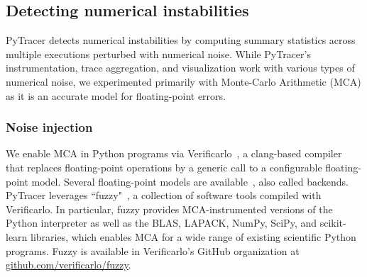 \documentclass[11pt]{article}
\newcommand{\tristan}[1]{\color{orange}\textbf{From Tristan:} #1\color{black}\xspace}
\newcommand{\Yohan}[1]{\color{green!75!black}\textbf{Yohan:} #1\color{black}\xspace}
\newcommand{\pytracer}[0]{PyTracer\xspace}
\begin{document}

\subsection{Detecting numerical instabilities}

\pytracer detects numerical instabilities by computing summary statistics across multiple executions perturbed with numerical noise. While \pytracer's instrumentation, trace aggregation, and visualization work with various types of numerical noise, we experimented primarily with Monte-Carlo Arithmetic (MCA) as it is an accurate model for floating-point errors.

\subsubsection{Noise injection}
\label{sec:fuzzy}


We enable MCA in Python programs via Verificarlo~\cite{verificarlo}, a clang-based compiler~\cite{lattner2008llvm} that replaces floating-point operations by a generic call to a configurable floating-point model. Several floating-point models are available~\cite{chatelain2019automatic,chatelain2019outils}, also called backends.
\pytracer leverages ``fuzzy"~\cite{kiar2020comparing}, a collection of software tools compiled with Verificarlo. In particular, fuzzy provides MCA-instrumented versions of the Python interpreter as well as the BLAS, LAPACK, NumPy, SciPy, and scikit-learn libraries, which enables MCA for a wide range of existing scientific Python programs. Fuzzy is available in Verificarlo's GitHub organization at \href{https://github.com/verificarlo/fuzzy}{\url{github.com/verificarlo/fuzzy}}.
\end{document}
